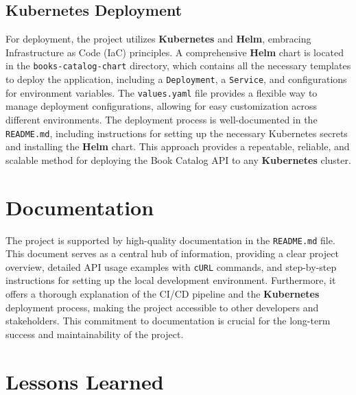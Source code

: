 \documentclass{article}
\begin{document}
\subsection{Kubernetes Deployment}

For deployment, the project utilizes \textbf{Kubernetes} and \textbf{Helm}, embracing Infrastructure as Code (IaC) principles. A comprehensive \textbf{Helm} chart is located in the \texttt{books-catalog-chart} directory, which contains all the necessary templates to deploy the application, including a \texttt{Deployment}, a \texttt{Service}, and configurations for environment variables. The \texttt{values.yaml} file provides a flexible way to manage deployment configurations, allowing for easy customization across different environments. The deployment process is well-documented in the \texttt{README.md}, including instructions for setting up the necessary Kubernetes secrets and installing the \textbf{Helm} chart. This approach provides a repeatable, reliable, and scalable method for deploying the Book Catalog API to any \textbf{Kubernetes} cluster.

\section{Documentation}

The project is supported by high-quality documentation in the \texttt{README.md} file. This document serves as a central hub of information, providing a clear project overview, detailed API usage examples with \texttt{cURL} commands, and step-by-step instructions for setting up the local development environment. Furthermore, it offers a thorough explanation of the CI/CD pipeline and the \textbf{Kubernetes} deployment process, making the project accessible to other developers and stakeholders. This commitment to documentation is crucial for the long-term success and maintainability of the project.

\section{Lessons Learned}
\end{document}
